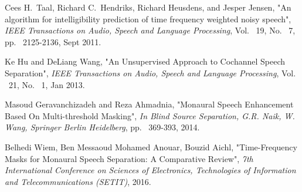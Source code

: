 \documentclass[a4paper]{article}
\begin{document}
\begin{thebibliography}{9}
Cees H.\ Taal, Richard C.\ Hendriks, Richard Heusdens, and Jesper Jensen, "An algorithm for intelligibility prediction of time frequency weighted noisy speech", \textit{IEEE Transactions on Audio, Speech and Language Processing}, Vol. ~19, No. ~7, pp. ~2125-2136, Sept 2011.            

Ke Hu and DeLiang Wang, "An Unsupervised Approach to Cochannel Speech Separation", \textit{IEEE Transactions on Audio, Speech and Language Processing}, Vol. ~21, No. ~1, Jan 2013.                     

Masoud Geravanchizadeh and Reza Ahmadnia, "Monaural Speech Enhancement Based On Multi-threshold Masking", \textit{In Blind Source Separation, G.R. Naik, W. Wang, Springer Berlin Heidelberg}, pp. ~369-393, 2014.

Belhedi Wiem, Ben Messaoud Mohamed Anouar, Bouzid Aichl, "Time-Frequency Masks for Monaural Speech Separation: A Comparative Review", \textit{7th International Conference on Sciences of Electronics, Technologies of Information and Telecommunications (SETIT)}, 2016.





 \end{thebibliography}
\end{document}
